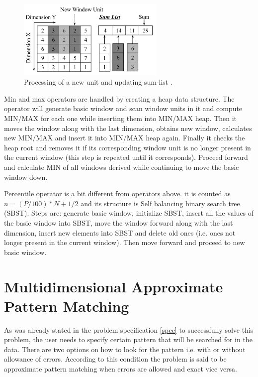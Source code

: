 \begin{figure}
\centering
\includegraphics[width=0.63\textwidth]{windowAM_sum2.PNG}
\caption{Processing of a new unit and updating sum-list \cite{windowAggr}.}
\label{windowAM2}
\end{figure}

Min and max operators are handled by creating a heap data structure. The operator will generate basic window and scan window units in it and compute MIN/MAX for each one while inserting them into MIN/MAX heap. Then it moves the window along with the last dimension, obtains new window, calculates new MIN/MAX and insert it into MIN/MAX heap again. Finally it checks the heap root and removes it if its corresponding window unit is no longer present in the current window (this step is repeated until it corresponds). Proceed forward and calculate MIN of all windows derived while continuing to move the basic window down.

Percentile operator is a bit different from operators above. it is counted as $n=(P/100)*N+1/2$ and its structure is Self balancing binary search tree (SBST). Steps are: generate basic window, initialize SBST, insert all the values of the basic window into SBST, move the window forward along with the last dimension, insert new elements into SBST and delete old ones (i.e. ones not longer present in the current window). Then move forward and proceed to new basic window. \cite{windowAggr}


\section{Multidimensional Approximate Pattern Matching}\label{multidimApprPattMatch}
As was already stated in the problem specification \ref{spec} to successfully solve this problem, the user needs to specify certain pattern that will be searched for in the data. There are two options on how to look for the pattern i.e. with or without allowance of errors. According to this condition the problem is said to be approximate pattern matching when errors are allowed and exact vice versa.

